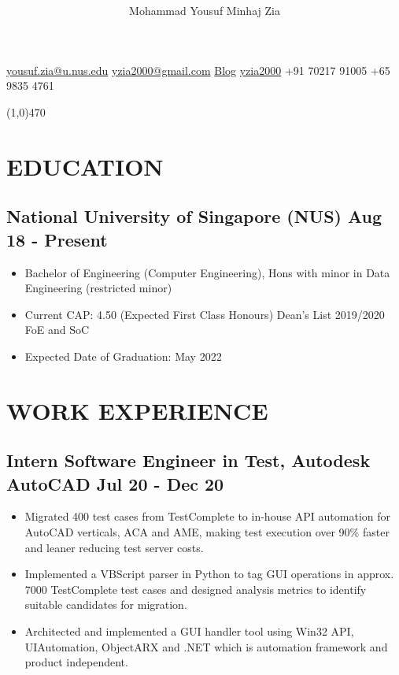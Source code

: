 \documentclass[11pts]{article}
\date{\vspace{-5ex}}
\title{\vspace{-5ex} \vspace{-5ex}}
\author{\Huge Mohammad Yousuf Minhaj Zia}
\begin{document}
\maketitle

\centerline{
\href{mailto:yousuf.zia@u.nus.edu}{yousuf.zia@u.nus.edu} \textbar \hspace{1pt}
\href{mailto:yzia2000@gmail.com}{yzia2000@gmail.com} \textbar \hspace{1pt} 
\href{https://yzia2000.github.io/blog}{Blog} \textbar \hspace{1pt} 
\href{https://github.com/yzia2000}{\faGithub \hspace{1pt} yzia2000} \textbar \hspace{1pt}
\href{https://www.linkedin.com/in/mohammad-yousuf-minhaj-zia-ab555396}{\faLinkedin} \textbar \hspace{1pt}
+91 70217 91005 \textbar \hspace{1pt} 
+65 9835 4761 
}

\line(1,0){470}\\

\section*{EDUCATION}
\subsection*{National University of Singapore (NUS) \hfill Aug 18 - Present}
\begin{itemize}
    \item Bachelor of Engineering (Computer Engineering), Hons with minor in Data Engineering (restricted minor)
    \item Current CAP: 4.50 (Expected First Class Honours) Dean's List 2019/2020 FoE and SoC
    \item Expected Date of Graduation: May 2022
\end{itemize}

\section*{WORK EXPERIENCE}

\subsection*{Intern Software Engineer in Test, Autodesk AutoCAD \hfill Jul 20 - Dec 20}
\begin{itemize}
    \item Migrated 400 test cases from TestComplete to in-house API automation for AutoCAD verticals, ACA and AME, making test execution over 90\% faster and leaner reducing test server costs.
    \item Implemented a VBScript parser in Python to tag GUI operations in approx. 7000 TestComplete test cases and designed analysis metrics to identify suitable candidates for migration.
    \item Architected and implemented a GUI handler tool using Win32 API, UIAutomation, ObjectARX and .NET which is automation framework and product independent.
\end{itemize}
\end{document}
